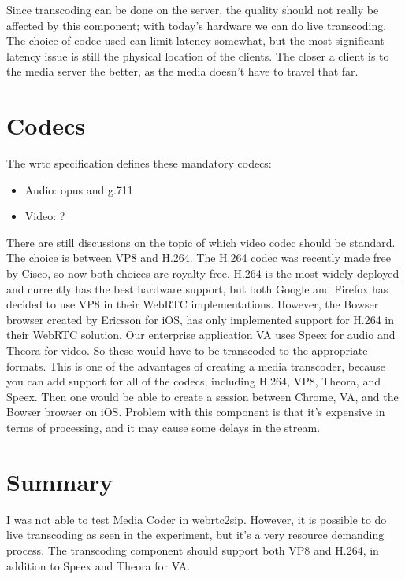 Since transcoding can be done on the server, the quality should not really be affected by this component; with today's hardware we can do live transcoding. The choice of codec used can limit latency somewhat, but the most significant latency issue is still the physical location of the clients. The closer a client is to the media server the better, as the media doesn't have to travel that far.

\section{Codecs}
\label{sec:codecs}

The \gls{wrtc} specification defines these mandatory codecs:
\begin{itemize}
    \item Audio: opus and g.711
    \item Video: ?
\end{itemize}

There are still discussions on the topic of which video codec should be standard. The choice is between VP8 and H.264. The H.264 codec was recently made free by Cisco\cite{h264-free}, so now both choices are royalty free. H.264 is the most widely deployed and currently has the best hardware support, but both Google and Firefox has decided to use VP8 in their WebRTC implementations. However, the Bowser browser created by Ericsson for iOS, has only implemented support for H.264 in their WebRTC solution. Our enterprise application VA uses Speex for audio and Theora for video. So these would have to be transcoded to the appropriate formats. This is one of the advantages of creating a media transcoder, because you can add support for all of the codecs, including H.264, VP8, Theora, and Speex. Then one would be able to create a session between Chrome, VA, and the Bowser browser on iOS. Problem with this component is that it's expensive in terms of processing, and it may cause some delays in the stream.

\section{Summary}
I was not able to test Media Coder in webrtc2sip. However, it is possible to do live transcoding as seen in the experiment, but it's a very resource demanding process. The transcoding component should support both VP8 and H.264, in addition to Speex and Theora for VA.